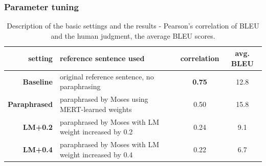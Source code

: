 \documentclass[11pt]{article}
\begin{document}

\subsubsection{Parameter tuning}

\begin{table}[tb]
\begin{tabular}{r|l|c|c}
setting & reference sentence used & correlation & avg. BLEU \\
\hline
\textbf{Baseline} & original reference sentence, no paraphrasing & \textbf{0.75} & 12.8 \\
\textbf{Paraphrased} & paraphrased by Moses using MERT-learned weights  & 0.50  & 15.8 \\
\textbf{LM+0.2}  & paraphrased by Moses with LM weight increased by 0.2  & 0.24 & 9.1 \\
\textbf{LM+0.4} & paraphrased by Moses with LM weight increased by 0.4  & 0.22 & 6.7 \\
\end{tabular}
\caption{Description of the basic settings and the results - Pearson's 
correlation of BLEU and the human judgment, the average BLEU scores.} 
\label{moses_settings}
\end{table}
\end{document}
